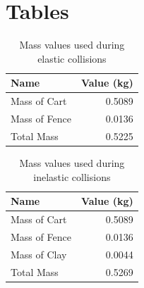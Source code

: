 \section{Tables}
\begin{table}[ht]
    \centering
    \begin{tabular}{|l|r|}
        \hline
        Name & Value (kg) \\
        \hline
        Mass of Cart & 0.5089 \\
        Mass of Fence & 0.0136 \\
        \hline
        Total Mass & 0.5225 \\
        \hline
    \end{tabular}
    \caption{Mass values used during elastic collisions}
    \label{table:08.mass.elastic}
\end{table}
\begin{table}[ht]
    \centering
    \begin{tabular}{|l|r|}
        \hline
        Name & Value (kg) \\
        \hline
        Mass of Cart & 0.5089 \\
        Mass of Fence & 0.0136 \\
        Mass of Clay & 0.0044 \\
        \hline
        Total Mass & 0.5269 \\
        \hline
    \end{tabular}
    \caption{Mass values used during inelastic collisions}
    \label{table:08.mass.inelastic}
\end{table}

